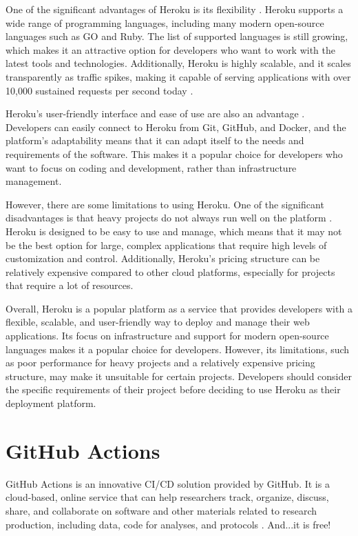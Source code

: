One of the significant advantages of Heroku is its flexibility \cite{greengard, anubhav, patrick}. Heroku supports a wide range of programming languages, including many modern open-source languages such as GO and Ruby. The list of supported languages is still growing, which makes it an attractive option for developers who want to work with the latest tools and technologies. Additionally, Heroku is highly scalable, and it scales transparently as traffic spikes, making it capable of serving applications with over 10,000 sustained requests per second today \cite{anubhav}.

Heroku's user-friendly interface and ease of use are also an advantage \cite{greengard}. Developers can easily connect to Heroku from Git, GitHub, and Docker, and the platform's adaptability means that it can adapt itself to the needs and requirements of the software. This makes it a popular choice for developers who want to focus on coding and development, rather than infrastructure management.

However, there are some limitations to using Heroku. One of the significant disadvantages is that heavy projects do not always run well on the platform \cite{greengard}. Heroku is designed to be easy to use and manage, which means that it may not be the best option for large, complex applications that require high levels of customization and control. Additionally, Heroku's pricing structure can be relatively expensive compared to other cloud platforms, especially for projects that require a lot of resources.

Overall, Heroku is a popular platform as a service that provides developers with a flexible, scalable, and user-friendly way to deploy and manage their web applications. Its focus on infrastructure and support for modern open-source languages makes it a popular choice for developers. However, its limitations, such as poor performance for heavy projects and a relatively expensive pricing structure, may make it unsuitable for certain projects. Developers should consider the specific requirements of their project before deciding to use Heroku as their deployment platform.

\section{GitHub Actions}
GitHub Actions is an innovative CI/CD solution provided by GitHub. It is a cloud-based, online service that can help researchers track, organize, discuss, share, and collaborate on software and other materials related to research production, including data, code for analyses, and protocols \cite{ds, kimetal}. And...it is free!

